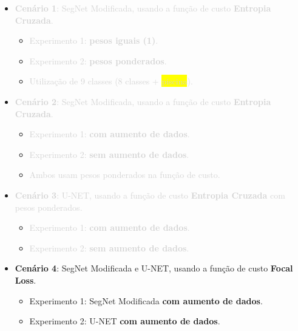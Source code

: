 \documentclass[%
  10pt,%
  aspectratio = 169,%
  compress,%
  t,%
  english,%
  brazilian,%
  tikz,
]{beamer}
\begin{document}
\begin{frame}

    \begin{itemize}
        \item \textcolor{lightgray}{\textbf{Cenário 1}: SegNet Modificada, usando a função de custo \textbf{Entropia Cruzada}.}
        \begin{itemize}
            \item \textcolor{lightgray}{Experimento 1: \textbf{pesos iguais (1)}.}
            \item \textcolor{lightgray}{Experimento 2: \textbf{pesos ponderados}.}
            \item \textcolor{lightgray}{Utilização de 9 classes (8 classes + \colorbox{yellow}{piscina}).}
        \end{itemize}
    \end{itemize}
    \begin{itemize}
        \item \textcolor{lightgray}{\textbf{Cenário 2}: SegNet Modificada, usando a função de custo \textbf{Entropia Cruzada}.}
        \begin{itemize}
            \item \textcolor{lightgray}{Experimento 1: \textbf{com aumento de dados}.}
            \item \textcolor{lightgray}{Experimento 2: \textbf{sem aumento de dados}.}
            \item \textcolor{lightgray}{Ambos usam pesos ponderados na função de custo.}
        \end{itemize}
    \end{itemize}
    \begin{itemize}
        \item \textcolor{lightgray}{\textbf{Cenário 3}: U-NET, usando a função de custo \textbf{Entropia Cruzada} com pesos ponderados.}
        \begin{itemize}
            \item \textcolor{lightgray}{Experimento 1: \textbf{com aumento de dados}.}
            \item \textcolor{lightgray}{Experimento 2: \textbf{sem aumento de dados}.}
        \end{itemize}
    \end{itemize}
    \begin{itemize}
        \item \textbf{Cenário 4}: SegNet Modificada e U-NET, usando a função de custo \textbf{Focal Loss}.
        \begin{itemize}
            \item Experimento 1: SegNet Modificada \textbf{com aumento de dados}.
            \item Experimento 2: U-NET \textbf{com aumento de dados}.
        \end{itemize}
    \end{itemize}
    

\end{frame}
\end{document}
